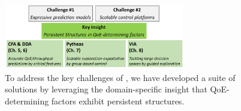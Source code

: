 
\begin{figure}[t!]
\centering
\includegraphics[width=0.7\textwidth]{figures/intro-contribution.pdf}
\caption{To address the key challenges
of \ddn, we have developed a suite of solutions by leveraging the domain-specific 
insight that QoE-determining factors
exhibit persistent structures.}
\label{fig:intro-contribution}
\end{figure}


